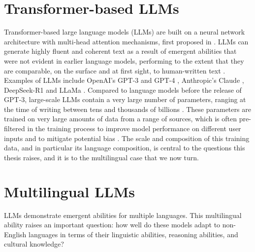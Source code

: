 \documentclass[thesis]{cluu}
\providecommand{\DIFadd}[1]{\texorpdfstring{\highLight[yellow]{#1}}{#1}} %
\providecommand{\DIFadd}[1]{#1} %
\providecommand{\DIFdel}[1]{} %
\providecommand{\DIFaddbegin}{} %
\providecommand{\DIFaddend}{} %
\providecommand{\DIFdelbegin}{} %
\providecommand{\DIFdelend}{} %
\begin{document}
\section{Transformer-based LLMs}
Transformer-based large language models (LLMs) are built on a neural network architecture with multi-head attention mechanisms, first proposed in \textcite{vaswani2017attention}. LLMs can generate highly fluent and coherent text as a result of emergent abilities that were not evident in earlier language models, performing to the extent that they are comparable, on the surface and at first sight, to human-written text \parencite{mahowald2024dissociating,wei2022emergent}. Examples of LLMs include OpenAI's GPT-3 \parencite{brown2020language} and GPT-4 \parencite{openai2023gpt4}, Anthropic's Claude \parencite{anthropic2024claude}, DeepSeek-R1 \DIFdelbegin \DIFdel{\parencite{DeepSeek-R1ai2024DeepSeek-R1v3} }\DIFdelend \DIFaddbegin \DIFadd{\parencite{Guo_2025} }\DIFaddend and LLaMa \parencite{touvron2023llama}. Compared to language models before the release of GPT-3, large-scale LLMs contain a very large number of parameters, ranging at the time of writing between tens and thousands of billions \parencite{brown2020language, DeepSeek-R1ai2024DeepSeek-R1v3, fedus2022switch}. These parameters are trained on very large amounts of data from a range of sources, which is often pre-filtered in the training process to improve model performance on different user inputs and to mitigate potential bias \parencite{raffel2020exploring, dodge2021documenting, gehman2020realtoxicityprompts, brown2020language}. The scale and composition of this training data, and in particular its language composition, is central to the questions this thesis raises, and it is to the multilingual case that we now turn.

\section{Multilingual LLMs}
LLMs demonstrate emergent abilities for multiple languages. This multilingual ability raises an important question: how well do these models adapt to non-English languages in terms of their linguistic abilities, reasoning abilities, and cultural knowledge?
\end{document}
